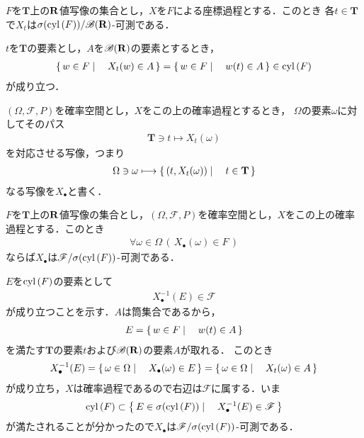 	\begin{screen}
		\begin{thm}[座標過程は可測]\label{thm:coordinate_process_is_stochastic}
			$F$を$\mathbf{T}$上の$\mathbf{R}$値写像の集合とし，$X$を$F$による座標過程とする．このとき
			各$t \in \mathbf{T}$で$X_t$は$\sigma(\operatorname{cyl}\left(F\right))/\mathscr{B}(\mathbf{R})$-可測である．
		\end{thm}
	\end{screen}
	
	\begin{sketch}
		$t$を$\mathbf{T}$の要素とし，$A$を$\mathscr{B}(\mathbf{R})$の要素とするとき，
		\begin{align}
			\left\{\, w \in F \mid \quad X_t(w) \in A\, \right\}
			= \left\{\, w \in F \mid \quad w(t) \in A\, \right\}
			\in \operatorname{cyl}\left(F\right)
		\end{align}
		が成り立つ．
		\QED
	\end{sketch}
	
	$(\Omega,\mathscr{F},P)$を確率空間とし，$X$をこの上の確率過程とするとき，
	$\Omega$の要素$\omega$に対してそのパス
	\begin{align}
		\mathbf{T} \ni t \longmapsto X_t(\omega)
	\end{align}
	を対応させる写像，つまり
	\begin{align}
		\Omega \ni \omega \longmapsto \left\{\, (t,X_t(\omega)) \mid \quad t \in \mathbf{T}\, \right\}
	\end{align}
	なる写像を$X_\bullet$と書く．
	
	\begin{screen}
		\begin{thm}
			$F$を$\mathbf{T}$上の$\mathbf{R}$値写像の集合とし，$(\Omega,\mathscr{F},P)$を確率空間とし，$X$をこの上の確率過程とする．このとき
			\begin{align}
				\forall \omega \in \Omega\, \left(\, X_\bullet(\omega) \in F\, \right)
			\end{align}
			ならば$X_\bullet$は$\mathscr{F}/\sigma(\operatorname{cyl}\left(F\right))$-可測である．
		\end{thm}
	\end{screen}
	
	\begin{sketch}
		$E$を$\operatorname{cyl}\left(F\right)$の要素として
		\begin{align}
			X_\bullet^{-1}(E) \in \mathscr{F}
		\end{align}
		が成り立つことを示す．$A$は筒集合であるから，
		\begin{align}
			E = \left\{\, w \in F \mid \quad w(t) \in A\, \right\}
		\end{align}
		を満たす$\mathbf{T}$の要素$t$および$\mathscr{B}(\mathbf{R})$の要素$A$が取れる．
		このとき
		\begin{align}
			X_\bullet^{-1}(E) = \left\{\, \omega \in \Omega \mid \quad X_\bullet(\omega) \in E\, \right\}
			= \left\{\, \omega \in \Omega \mid \quad X_t(\omega) \in A\, \right\}
		\end{align}
		が成り立ち，$X$は確率過程であるので右辺は$\mathscr{F}$に属する．いま
		\begin{align}
			\operatorname{cyl}\left(F\right) \subset \left\{\, E \in \sigma(\operatorname{cyl}\left(F\right)) \mid \quad X_\bullet^{-1}(E) \in \mathscr{F}\, \right\}
		\end{align}
		が満たされることが分かったので$X_\bullet$は$\mathscr{F}/\sigma(\operatorname{cyl}\left(F\right))$-可測である．
		\QED
	\end{sketch}
	

